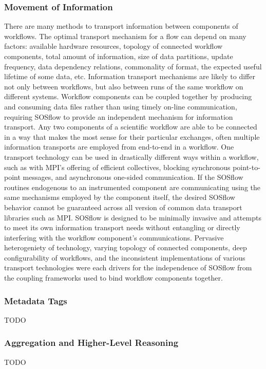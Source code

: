 \subsubsection{Movement of Information}
There are many methods to transport information between components of
workflows.
%
The optimal transport mechanism for a flow can depend on many factors:
available hardware resources, topology of connected workflow
components, total amount of information, size of data partitions,
update frequency, data dependency relations, commonality of format,
the expected useful lifetime of some data, etc.
%
Information transport mechanisms are likely to differ not only between
workflows, but also between runs of the same workflow on different systems.
%
Workflow components can be coupled together by producing and consuming
data files rather than using timely on-line communication, requiring
SOSflow to provide an independent mechanism for information transport.
%
Any two components of a scientific workflow are able to be connected
in a way that makes the most sense for their particular exchanges,
often multiple information transports are employed from end-to-end in
a workflow.
%
One transport technology can be used in drastically different ways
within a workflow, such as with MPI's offering of efficient
collectives, blocking synchronous point-to-point messages, and
asynchronous one-sided communication.
%
If the SOSflow routines endogenous to an instrumented component are
communicating using the same mechanisms employed by the component
itself, the desired SOSflow behavior cannot be guaranteed across all
version of common data transport libraries such as MPI.
%
SOSflow is designed to be minimally invasive and attempts to meet its
own information transport needs without entangling or directly
interfering with the workflow component's communications.
%
Pervasive heterogeniety of technology, varying topology of connected
components, deep configurability of workflows, and the inconsistent
implementations of various transport technologies were each drivers
for the independence of SOSflow from the coupling frameworks used to
bind workflow components together.

\subsubsection{Metadata Tags}
TODO

\subsubsection{Aggregation and Higher-Level Reasoning}
TODO


